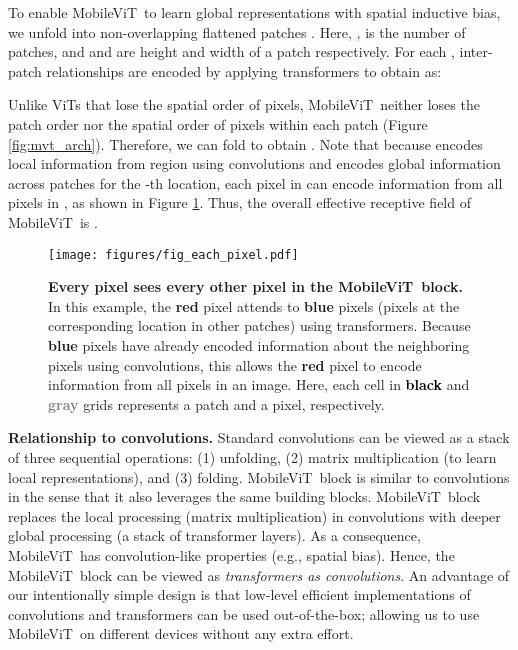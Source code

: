 \documentclass[preprint]{article} \usepackage{iclr2022_conference,times}
\newcommand{\arch}{MobileViT}
\providecommand{\sachin}[1]{{\protect\color{black}{#1}}}
\begin{document}
To enable \arch~to learn global representations with spatial inductive bias, we unfold  into  non-overlapping flattened patches . Here, ,  is the number of patches, and  and  are height and width of a patch respectively. For each , inter-patch relationships are encoded by applying transformers to obtain  as:

Unlike ViTs that lose the spatial order of pixels, \arch~neither loses the patch order nor the spatial order of pixels within each patch (Figure \ref{fig:mvt_arch}). Therefore, we can fold  to obtain . \sachin{ is then projected to low -dimensional space using a point-wise convolution and combined with  via concatenation operation. Another  convolutional layer is then used to fuse these concatenated features.} Note that because  encodes local information from  region using convolutions and  encodes global information across  patches for the -th location, each pixel in  can encode information from all pixels in , as shown in Figure \ref{fig:rep_learning}. Thus, the overall effective receptive field of \arch~is .

\begin{figure}[t!]
    \centering
    \texttt{[image: figures/fig\_each\_pixel.pdf]}
    \caption{\textbf{Every pixel sees every other pixel in the \arch~block.} In this example, the \textcolor{centerPix}{\bf red} pixel attends to \textcolor{patchPix}{\bf blue} pixels (pixels at the corresponding location in other patches) using transformers. Because \textcolor{patchPix}{\bf blue} pixels have already encoded information about the neighboring pixels using convolutions, this allows the \textcolor{centerPix}{\bf red} pixel to encode information from all pixels in an image. Here, each cell in \textcolor{black}{\bf black} and \textcolor{gray}{\bf gray} grids represents a patch and a pixel, respectively.}
    \label{fig:rep_learning}
\end{figure}


\textbf{Relationship to convolutions.} Standard convolutions can be viewed as a stack of three sequential operations: (1) unfolding, (2) matrix multiplication (to learn local representations), and (3) folding. \arch~block is similar to convolutions in the sense that it  also leverages the same building blocks. \arch~block replaces the local processing (matrix multiplication) in convolutions with deeper global processing (a stack of transformer layers). As a consequence, \arch~has convolution-like properties (e.g., spatial bias). Hence, the \arch~block can be viewed as \emph{transformers as convolutions}. An advantage of our intentionally simple design is that low-level efficient implementations of convolutions and transformers can be used out-of-the-box; allowing us to use \arch~on different devices without any extra effort.
\end{document}
